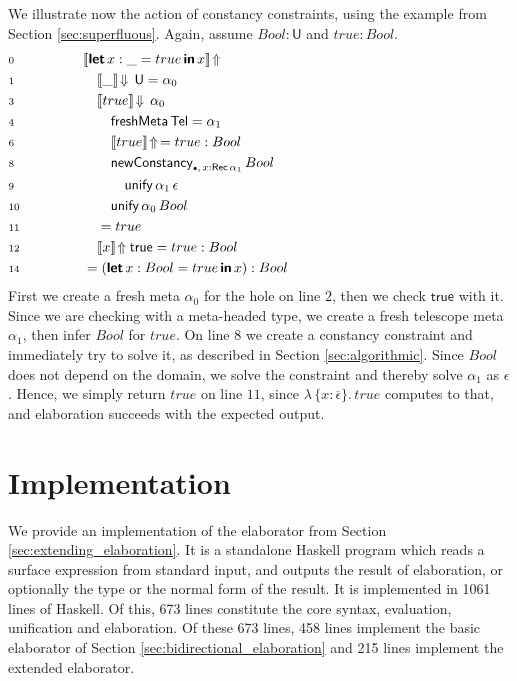 \documentclass[acmsmall,review,anonymous,prologue,dvipsnames]{acmart}\settopmatter{printfolios=true,printccs=false,printacmref=false}
\newcommand{\slet}{\boldsymbol{\mathsf{let}}}
\renewcommand{\sin}{\boldsymbol{\mathsf{in}}}
\renewcommand{\U}{\mathsf{U}}
\newcommand{\emptycon}{\scaleobj{.75}\bullet}
\newcommand{\unify}{\mathsf{unify}}
\newcommand{\echeckt}[2]{\llbracket#1\rrbracket\!\Downarrow\,#2}
\newcommand{\einfert}[1]{\llbracket#1\rrbracket\!\Uparrow}
\newcommand{\true}{\mathsf{true}}
\newcommand{\Tel}{\mathsf{Tel}}
\newcommand{\Rec}{\mathsf{Rec}}
\newcommand{\ol}[1]{\overline{#1}}
\theoremstyle{remark}
\begin{document}
\begin{example}
We illustrate now the action of constancy constraints, using the example from
Section \ref{sec:superfluous}. Again, assume $Bool : \U$ and $true : Bool$.
\begin{alignat*}{3}
& \scriptstyle{0}\qquad\qquad && \einfert{\slet\,x : \_ = true\,\sin\,x}
      \hspace{21em}\\
& \scriptstyle{1} && \quad \echeckt{\_}{\U} = \alpha_0\\
& \scriptstyle{3} && \quad \echeckt{true}{\alpha_0}\\
& \scriptstyle{4} && \qquad \mathsf{freshMeta}\,\Tel = \alpha_1\\
& \scriptstyle{6} && \qquad \einfert{true}\,= true : Bool\\
& \scriptstyle{8} && \qquad \mathsf{newConstancy}_{\emptycon,\,x : \Rec\,\alpha_1}\,Bool\\
& \scriptstyle{9} && \qquad\quad \unify\,\alpha_1\,\epsilon\\
& \scriptstyle{10} && \qquad \unify\,\alpha_0\,Bool\\
& \scriptstyle{11} && \quad = true\\
& \scriptstyle{12} && \quad \einfert{x}{\true} = true : Bool\\
& \scriptstyle{14} && = (\slet\,x : Bool = true\,\sin\,x) : Bool
\end{alignat*}
First we create a fresh meta $\alpha_0$ for the hole on line $\scriptstyle{2}$,
then we check $\true$ with it. Since we are checking with a meta-headed type, we
create a fresh telescope meta $\alpha_1$, then infer $Bool$ for $true$. On line
$\scriptstyle{8}$ we create a constancy constraint and immediately try to solve
it, as described in Section \ref{sec:algorithmic}. Since $Bool$ does not depend
on the domain, we solve the constraint and thereby solve $\alpha_1$ as
$\epsilon$. Hence, we simply return $true$ on line $\scriptstyle{11}$, since
$\lambda\,\{x : \ol{\epsilon}\}.\,true$ computes to that, and elaboration
succeeds with the expected output.
\end{example}

\section{Implementation}
\label{sec:impl_and_eval}

We provide an implementation of the elaborator from Section
\ref{sec:extending_elaboration}. It is a standalone Haskell program which reads
a surface expression from standard input, and outputs the result of elaboration,
or optionally the type or the normal form of the result. It is implemented in
1061 lines of Haskell. Of this, 673 lines constitute the core syntax,
evaluation, unification and elaboration. Of these 673 lines, 458 lines implement
the basic elaborator of Section \ref{sec:bidirectional_elaboration} and 215
lines implement the extended elaborator.
\end{document}
